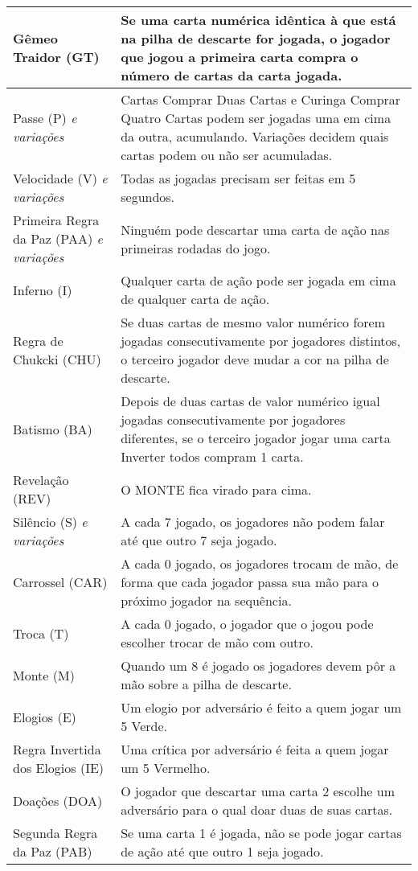 \begin{center}
\begin{longtable}{|p{4cm}|p{5cm}|}
Gêmeo Traidor (GT) & Se uma carta numérica idêntica à que está na pilha de descarte for jogada, o jogador que jogou a primeira carta compra o número de cartas da carta jogada. \\ \hline
Passe (P) \emph{e variações} & Cartas Comprar Duas Cartas e Curinga Comprar Quatro Cartas podem ser jogadas uma em cima da outra, acumulando. Variações decidem quais cartas podem ou não ser acumuladas. \\ \hline
Velocidade (V) \emph{e variações} & Todas as jogadas precisam ser feitas em 5 segundos. \\ \hline
Primeira Regra da Paz (PAA) \emph{e variações} & Ninguém pode descartar uma carta de ação nas primeiras rodadas do jogo. \\ \hline
Inferno (I) & Qualquer carta de ação pode ser jogada em cima de qualquer carta de ação. \\ \hline
Regra de Chukcki (CHU) & Se duas cartas de mesmo valor numérico forem jogadas consecutivamente por jogadores distintos, o terceiro jogador deve mudar a cor na pilha de descarte. \\ \hline
Batismo (BA) & Depois de duas cartas de valor numérico igual jogadas consecutivamente por jogadores diferentes, se o terceiro jogador jogar uma carta Inverter todos compram 1 carta. \\ \hline
Revelação (REV) & O MONTE fica virado para cima. \\ \hline
Silêncio (S) \emph{e variações} & A cada 7 jogado, os jogadores não podem falar até que outro 7 seja jogado. \\ \hline
Carrossel (CAR) & A cada 0 jogado, os jogadores trocam de mão, de forma que cada jogador passa sua mão para o próximo jogador na sequência. \\ \hline
Troca (T) & A cada 0 jogado, o jogador que o jogou pode escolher trocar de mão com outro. \\ \hline
Monte (M) & Quando um 8 é jogado os jogadores devem pôr a mão sobre a pilha de descarte. \\ \hline
Elogios (E) & Um elogio por adversário é feito a quem jogar um 5 Verde. \\ \hline
Regra Invertida dos Elogios (IE) & Uma crítica por adversário é feita a quem jogar um 5 Vermelho. \\ \hline
Doações (DOA) & O jogador que descartar uma carta 2 escolhe um adversário para o qual doar duas de suas cartas. \\ \hline
Segunda Regra da Paz (PAB) & Se uma carta 1 é jogada, não se pode jogar cartas de ação até que outro 1 seja jogado. \\ \hline 

\end{longtable}
\end{center}
